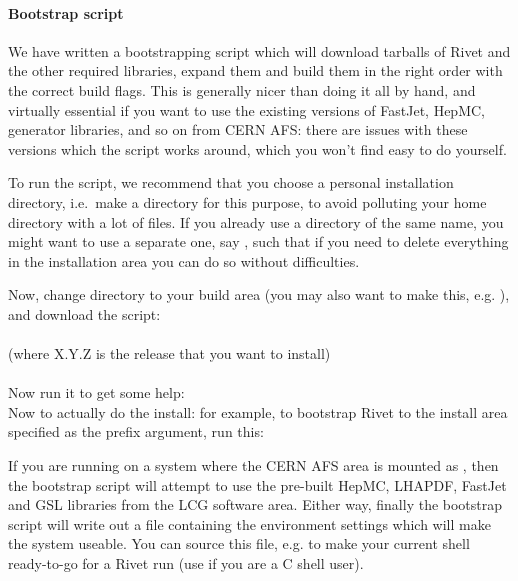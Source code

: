 \paragraph{Bootstrap script}

We have written a bootstrapping
script which will download tarballs of Rivet and the other required
libraries, expand them and build them in the right order with the correct build
flags. This is generally nicer than doing it all by hand, and virtually
essential if you want to use the existing versions of FastJet, HepMC, generator
libraries, and so on from CERN AFS: there are issues with these versions which
the script works around, which you won't find easy to do yourself.

To run the script, we recommend that you choose a personal installation
directory, i.e.\ make a  directory for this purpose, to
avoid polluting your home directory with a lot of files. If you already use a
directory of the same name, you might want to use a separate one, say
, such that if you need to delete everything in the
installation area you can do so without difficulties.

Now, change directory to your build area (you may also want to make this,
e.g. ), and download the script:\\
\\
(where X.Y.Z is the release that you want to install)\\
\\
Now run it to get some help:
\\
Now to actually do the install: for example, to bootstrap Rivet %
to the install area specified as the prefix argument, run this:\\

If you are running on a system where the CERN AFS area is mounted as
, then the bootstrap script will attempt to use the pre-built
HepMC\cite{Dobbs:2001ck}, LHAPDF\cite{Whalley:2005nh},
FastJet\cite{Cacciari:2005hq,fastjetweb} and GSL libraries from the LCG software area.
Either way, finally the bootstrap script will write out a file containing the
environment settings which will make the system useable. You can source this
file, e.g.  to make your current shell ready-to-go
for a Rivet run (use  if you are a C shell user).

